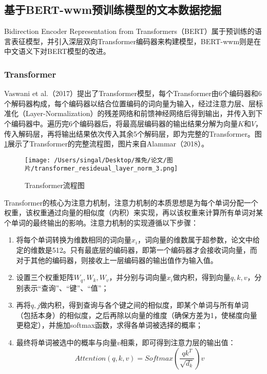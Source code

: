 \documentclass[lang=cn]{elegantpaper}
\begin{document}
\subsection{基于BERT-wwm预训练模型的文本数据挖掘}
Bidirection Encoder Representation from Transformers（BERT）属于预训练的语言表征模型，并引入深层双向Transformer编码器来构建模型，BERT-wwm则是在中文语义下对BERT模型的改进。%

\subsubsection{Transformer}
Vaswani et al.（2017）\cite{25}提出了Transformer模型，每个Transformer由6个编码器和6个解码器构成，每个编码器以结合位置编码的词向量为输入，经过注意力层、层标准化（Layer-Normalization）的残差网络和前馈神经网络后得到输出，并传入到下个编码器中。遍历完6个编码器后，将最高层编码器的输出结果分解为向量$K$和$V$，传入解码层，再将输出结果依次传入其余5个解码层，即为完整的Transformer。图\ref{图1}展示了Transformer的完整流程图，图片来自Alammar（2018）\cite{26}。

\begin{figure}[htb]
    \centering
    \texttt{[image: /Users/singal/Desktop/推免/论文/图片/transformer\_resideual\_layer\_norm\_3.png]}
    \caption{Transformer流程图}
    \label{图1}
\end{figure}

Transformer的核心为注意力机制，注意力机制的本质思想是为每个单词分配一个权重，该权重通过向量的相似度（内积）来实现，再以该权重来计算所有单词对某个单词的最终输出的影响。注意力机制的实现遵循以下步骤：
\begin{enumerate}
    \item 将每个单词转换为维数相同的词向量$x_i$，词向量的维数属于超参数，论文中给定的维数是512。只有最底层的编码器，即第一个编码器才会接收词向量，而对于其他的编码器，则接收上一层编码器的输出值作为输入值。
    \item 设置三个权重矩阵$W_q,W_k,W_v$，并分别与词向量$x_i$做内积，得到向量$q,k,v$，分别表示“查询”、“键”、“值”；
    \item 再将$q,j$做内积，得到查询与各个键之间的相似度，即某个单词与所有单词（包括本身）的相似度，之后再除以向量的维度（确保方差为1，使梯度向量更稳定），并施加softmax函数，求得各单词被选择的概率；
    \item 最终将单词被选中的概率与向量$v$相乘，即可得到注意力层的输出值：
    \begin{equation}
        Attention(q,k,v)=Softmax\left(\frac{qk^T}{\sqrt {d_k}}\right)v
    \end{equation}
\end{enumerate}
\end{document}
